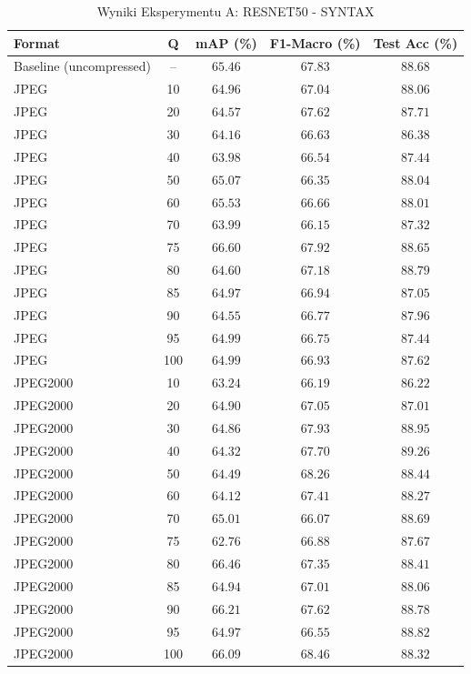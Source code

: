\begin{table}[htbp]
\centering
\caption{Wyniki Eksperymentu A: RESNET50 - SYNTAX}
\label{tab:experiment_a_resnet50}
\begin{tabular}{lcccc}
\hline
Format & Q & mAP (\%) & F1-Macro (\%) & Test Acc (\%) \\
\hline
Baseline (uncompressed) & -- & $65.46$ & $67.83$ & $88.68$ \\
\hline
JPEG & 10 & $64.96$ & $67.04$ & $88.06$ \\
JPEG & 20 & $64.57$ & $67.62$ & $87.71$ \\
JPEG & 30 & $64.16$ & $66.63$ & $86.38$ \\
JPEG & 40 & $63.98$ & $66.54$ & $87.44$ \\
JPEG & 50 & $65.07$ & $66.35$ & $88.04$ \\
JPEG & 60 & $65.53$ & $66.66$ & $88.01$ \\
JPEG & 70 & $63.99$ & $66.15$ & $87.32$ \\
JPEG & 75 & $66.60$ & $67.92$ & $88.65$ \\
JPEG & 80 & $64.60$ & $67.18$ & $88.79$ \\
JPEG & 85 & $64.97$ & $66.94$ & $87.05$ \\
JPEG & 90 & $64.55$ & $66.77$ & $87.96$ \\
JPEG & 95 & $64.99$ & $66.75$ & $87.44$ \\
JPEG & 100 & $64.99$ & $66.93$ & $87.62$ \\
JPEG2000 & 10 & $63.24$ & $66.19$ & $86.22$ \\
JPEG2000 & 20 & $64.90$ & $67.05$ & $87.01$ \\
JPEG2000 & 30 & $64.86$ & $67.93$ & $88.95$ \\
JPEG2000 & 40 & $64.32$ & $67.70$ & $89.26$ \\
JPEG2000 & 50 & $64.49$ & $68.26$ & $88.44$ \\
JPEG2000 & 60 & $64.12$ & $67.41$ & $88.27$ \\
JPEG2000 & 70 & $65.01$ & $66.07$ & $88.69$ \\
JPEG2000 & 75 & $62.76$ & $66.88$ & $87.67$ \\
JPEG2000 & 80 & $66.46$ & $67.35$ & $88.41$ \\
JPEG2000 & 85 & $64.94$ & $67.01$ & $88.06$ \\
JPEG2000 & 90 & $66.21$ & $67.62$ & $88.78$ \\
JPEG2000 & 95 & $64.97$ & $66.55$ & $88.82$ \\
JPEG2000 & 100 & $66.09$ & $68.46$ & $88.32$ \\

\end{tabular}
\end{table}
